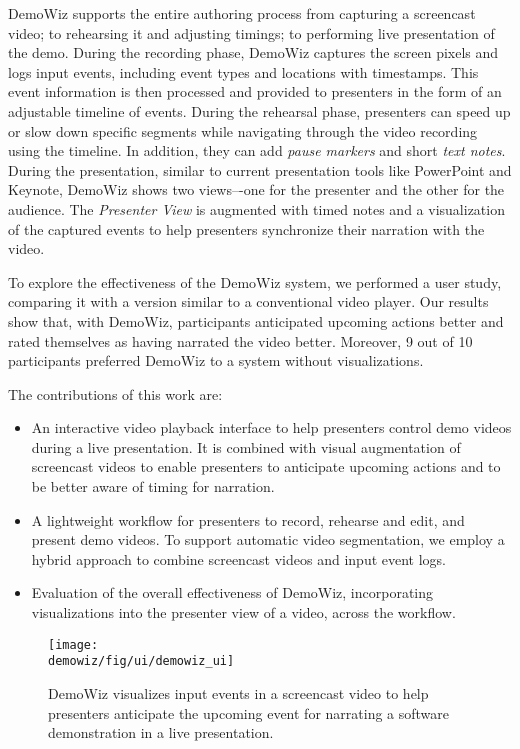 DemoWiz supports the entire authoring process from capturing a screencast video; to rehearsing it and adjusting timings; to performing live presentation of the demo. During the recording phase, DemoWiz captures the screen pixels and logs input events, including event types and locations with timestamps. This event information is then processed and provided to presenters in the form of an adjustable timeline of events. During the rehearsal phase, presenters can speed up or slow down specific segments while navigating through the video recording using the timeline. In addition, they can add \textit{pause markers} and short \textit{text notes}. During the presentation, similar to current presentation tools like PowerPoint and Keynote, DemoWiz shows two views–-one for the presenter and the other for the audience. The \textit{Presenter View} is augmented with timed notes and a visualization of the captured events to help presenters synchronize their narration with the video.

To explore the effectiveness of the DemoWiz system, we performed a user study, comparing it with a version similar to a conventional video player. Our results show that, with DemoWiz, participants anticipated upcoming actions better and rated themselves as having narrated the video better. Moreover, 9 out of 10 participants preferred DemoWiz to a system without visualizations.

The contributions of this work are:

\begin{itemize}
  \itemsep -2pt
  \item An interactive video playback interface to help presenters control demo videos during a live presentation. It is combined with visual augmentation of screencast videos to enable presenters to anticipate upcoming actions and to be better aware of timing for narration.
  \item A lightweight workflow for presenters to record, rehearse and edit, and present demo videos. To support automatic video segmentation, we employ a hybrid approach to combine screencast videos and input event logs.
  \item Evaluation of the overall effectiveness of DemoWiz, incorporating visualizations into the presenter view of a video, across the workflow.
\end{itemize}

\begin{figure*}[t]
  \centering
  \texttt{[image: \\demowiz/fig/ui/demowiz\_ui]}
  \caption{DemoWiz visualizes input events in a screencast video to help presenters anticipate the upcoming event for narrating a software demonstration in a live presentation.}
  \label{fig:demowiz_teaser}
\end{figure*}
